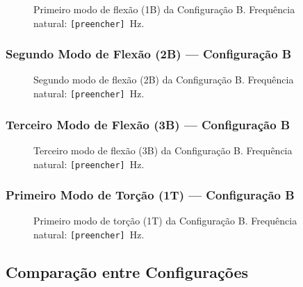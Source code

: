\documentclass[a4paper,fleqn]{cas-sc}
\begin{document}
\begin{figure}
    \centering
    \caption{Primeiro modo de flexão (1B) da Configuração B. 
    Frequência natural: \texttt{[preencher]}~\si{\hertz}.}
    \label{fig:modo1b}
\end{figure}

\subsubsection{Segundo Modo de Flexão (2B) --- Configuração B}

\begin{figure}
    \centering
    \caption{Segundo modo de flexão (2B) da Configuração B. 
    Frequência natural: \texttt{[preencher]}~\si{\hertz}.}
    \label{fig:modo2b}
\end{figure}

\subsubsection{Terceiro Modo de Flexão (3B) --- Configuração B}

\begin{figure}
    \centering
    \caption{Terceiro modo de flexão (3B) da Configuração B. 
    Frequência natural: \texttt{[preencher]}~\si{\hertz}.}
    \label{fig:modo3b}
\end{figure}

\subsubsection{Primeiro Modo de Torção (1T) --- Configuração B}

\begin{figure}
    \centering
    \caption{Primeiro modo de torção (1T) da Configuração B. 
    Frequência natural: \texttt{[preencher]}~\si{\hertz}.}
    \label{fig:modo_torcao_b}
\end{figure}

\subsection{Comparação entre Configurações}
\end{document}
